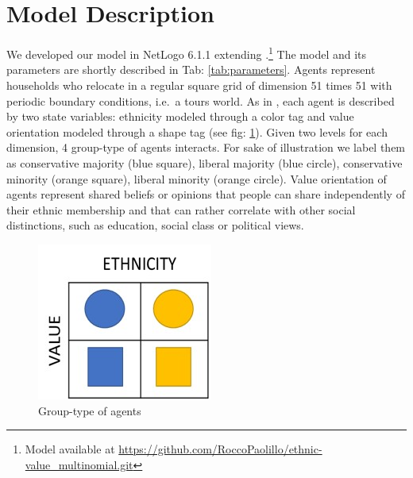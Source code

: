 \documentclass[
]{article}
\begin{document}
\hypertarget{model-description}{%
\section{Model Description}\label{model-description}}

We developed our model in NetLogo 6.1.1 \citep{wilenskynl} extending
\cite{paolillo2018}.\footnote{Model available at \url{https://github.com/RoccoPaolillo/ethnic-value_multinomial.git}}
The model and its parameters are shortly described in Tab:
\ref{tab:parameters}. Agents represent households who relocate in a
regular square grid of dimension 51 times 51 with periodic boundary
conditions, i.e.~a tours world. As in \cite{paolillo2018}, each agent is
described by two state variables: ethnicity modeled through a color tag
and value orientation modeled through a shape tag (see fig:
\ref{fig:model}). Given two levels for each dimension, 4 group-type of
agents interacts. For sake of illustration we label them as conservative
majority (blue square), liberal majority (blue circle), conservative
minority (orange square), liberal minority (orange circle). Value
orientation of agents represent shared beliefs or opinions that people
can share independently of their ethnic membership and that can rather
correlate with other social distinctions, such as education, social
class or political views.

\begin{figure}[h]

{\centering \includegraphics[width=0.7\linewidth]{model} 

}

\caption{Group-type of agents}\label{fig:model}
\end{figure}
\end{document}
